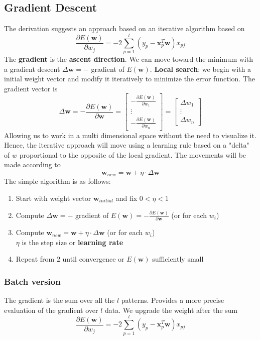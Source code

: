 \documentclass[10pt]{report}
\begin{document}
\subsection{Gradient Descent} The derivation suggests an approach based on an iterative algorithm based on $$\frac{\partial E(\mathbf{w})}{\partial w_j} = -2 \sum_{p=1}^l (y_p - \mathbf{x}_p^T \mathbf{w})x_{pj}$$ The \textbf{gradient} is the \textbf{ascent direction}. We can move toward the minimum with a gradient descent $\Delta \mathbf{w} = -$ gradient of $E(\mathbf{w})$. \textbf{Local search}: we begin with a initial weight vector and modify it iteratively to minimize the error function. The gradient vector is
$$\Delta \mathbf{w} = -\frac{\partial E(\mathbf{w})}{\partial \mathbf{w}} = \left[\begin{array}{c}
-\frac{\displaystyle\partial E(\mathbf{w})}{\displaystyle\partial w_1}\\\vdots\\-\frac{\displaystyle\partial E(\mathbf{w})}{\displaystyle\partial w_n}
\end{array}\right] = \left[\begin{array}{c}
\Delta w_1\\\vdots\\\Delta w_n
\end{array} \right]$$
Allowing us to work in a multi dimensional space without the need to visualize it. Hence, the iterative approach will move using a learning rule based on a "delta" of $w$ proportional to the opposite of the local gradient. The movements will be made according to $$\mathbf{w}_{new} = \mathbf{w} + \eta\cdot\Delta \mathbf{w}$$
The simple algorithm is as follows:
\begin{enumerate}
	\item Start with weight vector $\mathbf{w}_{initial}$ and fix $0 < \eta < 1$
	\item Compute $\Delta \mathbf{w} = -$ gradient of $E(\mathbf{w}) = -\frac{\partial E(\mathbf{w})}{\partial \mathbf{w}}$ (or for each $w_i$)
	\item Compute $\mathbf{w}_{new} = \mathbf{w} + \eta\cdot\Delta \mathbf{w}$ (or for each $w_i$)\\
	$\eta$ is the step size or \textbf{learning rate}
	\item Repeat from $2$ until convergence or $E(\mathbf{w})$ sufficiently small
\end{enumerate}
\subsubsection{Batch version} The gradient is the sum over all the $l$ patterns. Provides a more precise evaluation of the gradient over $l$ data. We upgrade the weight after the sum
$$\frac{\partial E(\mathbf{w})}{\partial w_j} = -2 \sum_{p=1}^l (y_p - \mathbf{x}_p^T \mathbf{w})x_{pj}$$
\end{document}
